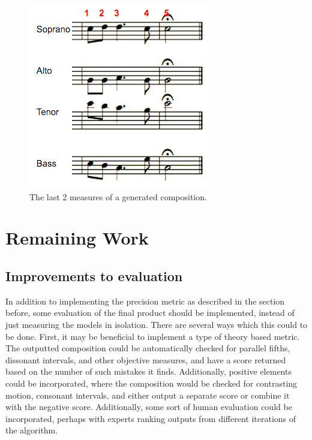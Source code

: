 \documentclass{sig-alternate}
\begin{document}
\begin{figure}
  \includegraphics[scale=0.8]{measures.png}
  \caption{The last 2 measures of a generated composition.}
\end{figure}



\section{Remaining Work}
\subsection{Improvements to evaluation}
In addition to implementing the precision metric as described in the section before, some evaluation of the final product should be implemented, instead of just measuring the models in isolation. There are several ways which this could to be done. First, it may be beneficial to implement a type of theory based metric. The outputted composition could be automatically checked for parallel fifths, dissonant intervals, and other objective measures, and have a score returned based on the number of such mistakes it finds. Additionally, positive elements could be incorporated, where the composition would be checked for contrasting motion, consonant intervals, and either output a separate score or combine it with the negative score. Additionally, some sort of human evaluation could be incorporated, perhaps with experts ranking outputs from different iterations of the algorithm.
\end{document}
